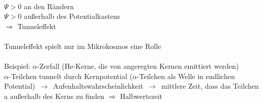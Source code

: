 \\
\mbox{\Large $\Psi > 0$} an den Rändern
\\
\mbox{\Large $\Psi > 0$} außerhalb des Potentialkastens
\\
$\Rightarrow$ Tunneleffekt
\\
\\
Tunneleffekt spielt nur im Mikrokosmos eine Rolle
\\
\\
Beispiel: $\alpha$-Zerfall (He-Kerne, die von angeregten Kernen emittiert werden)
\\
$\alpha$-Teilchen tunnelt durch Kernpotential ($\alpha$-Teilchen als Welle in endlichen 
Potential) $\,\to\,$ Aufenhaltswahrscheinlichkeit $\,\to\,$ mittlere Zeit, dass das Teilchen
a außerhalb des Kerns zu finden $\Rightarrow$ Halbwertszeit
